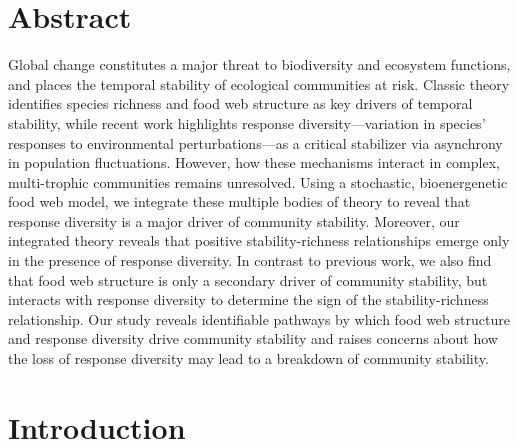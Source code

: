 \documentclass[
]{article}
\begin{document}
\pagebreak

\hypertarget{abstract}{%
\section{Abstract}\label{abstract}}

Global change constitutes a major threat to biodiversity and ecosystem
functions, and places the temporal stability of ecological communities at risk.
Classic theory identifies species richness and food web structure as key
drivers of temporal stability, while recent work highlights response
diversity---variation in species' responses to environmental perturbations---as a
critical stabilizer via asynchrony in population fluctuations. However, how
these mechanisms interact in complex, multi-trophic communities remains
unresolved. Using a stochastic, bioenergenetic food web model, we integrate
these multiple bodies of theory to reveal that response diversity is a major
driver of community stability. Moreover, our integrated theory reveals that
positive stability-richness relationships emerge only in the presence of
response diversity. In contrast to previous work, we also find that food web
structure is only a secondary driver of community stability, but interacts with
response diversity to determine the sign of the stability-richness
relationship. Our study reveals identifiable pathways by which food web
structure and response diversity drive community stability and raises concerns
about how the loss of response diversity may lead to a breakdown of community
stability.

\pagebreak

\hypertarget{introduction}{%
\section{Introduction}\label{introduction}}
\end{document}

